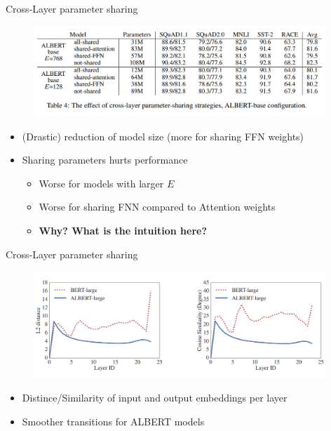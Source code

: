 \begin{frame}{Cross-Layer parameter sharing}

\vfill

	\begin{figure}
		\centering
		\includegraphics[width = 11cm]{figure/52-albert-param-sharing.png}\\ 
	\end{figure}

	\begin{itemize}
		\item (Drastic) reduction of model size (more for sharing FFN weights)
		\item Sharing parameters hurts performance
			\begin{itemize}
				\item Worse for models with larger $E$
				\item Worse for sharing FNN compared to Attention weights
		\item \ques \textbf{Why? What is the intuition here?}
			\end{itemize}
	\end{itemize}


\vfill

\end{frame}


\begin{frame}{Cross-Layer parameter sharing}

\vfill

	\begin{figure}
		\centering
		\includegraphics[width = 11cm]{figure/52-albert-param-sharing2.png}\\ 
	\end{figure}
	
\begin{itemize}
	\item Distince/Similarity of input and output embeddings per layer
	\item Smoother transitions for ALBERT models
\end{itemize}

\vfill

\end{frame}

